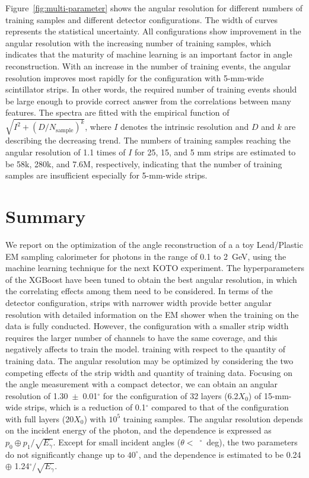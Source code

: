 \documentclass[12pt,times,draftclsnofoot,a4paper]{elsarticle}
\begin{document}
Figure~\ref{fig:multi-parameter} shows the angular resolution for different numbers of training samples and different detector configurations. The width of curves represents the statistical uncertainty. All configurations show improvement in the angular resolution with the increasing number of training samples, which indicates that the maturity of machine learning is an important factor in angle reconstruction. With an increase in the number of training events, the angular resolution improves most rapidly for the configuration with 5-mm-wide scintillator strips. In other words, the required number of training events should be large enough to provide correct answer from the correlations 
between many features. The spectra are fitted with the empirical function of $\sqrt{I^{2} + (D/N_{\mathrm{sample}})^{k}}$, where $I$ denotes the intrinsic resolution and $D$ and $k$ are describing the decreasing trend. The numbers of training samples reaching the angular resolution of 1.1 times of $I$ for 25, 15, and 5 mm strips are estimated to be 58k, 280k, and 7.6M, respectively, indicating that the number of training samples are insufficient especially for 5-mm-wide strips.
 
\section{Summary}
\label{sec:sum}

We report on the optimization of the angle reconstruction of a a toy Lead/Plastic EM sampling calorimeter for photons in the range of 0.1 to 2~GeV, using the machine learning technique for the next KOTO experiment. The hyperparameters of the XGBoost have been tuned to obtain the best angular resolution, in which the correlating effects among them need to be considered. In terms of the detector configuration, strips with narrower width provide better angular resolution with detailed information on the EM shower when the training on the data is fully conducted. However, the configuration with a smaller strip width requires the larger number of channels to have the same coverage, and this negatively affects to train the model. training with respect to the quantity of training data. The angular resolution may be optimized by considering the two competing effects of the strip width and quantity of training data. Focusing on the angle measurement with a compact detector, we can obtain an angular resolution of 1.30~$\pm$~0.01$^{\circ}$ for the configuration of 32 layers (6.2$X_{0}$) of 15-mm-wide strips, which is a reduction of 0.1$^{\circ}$ compared to that of the configuration with full layers (20$X_{0}$) with $10^{5}$ training samples. The angular resolution depends on the incident energy of the photon, and the dependence is expressed as $p_{0} \oplus p_{1}/\sqrt{E_{\gamma}}$. Except for small incident angles ($\theta<$~$^{\circ}$~deg), the two parameters do not significantly change up to $40^{\circ}$, and the dependence is estimated to be 0.24 $\oplus$ 1.24$^{\circ}/\sqrt{E_{\gamma}}$.
\end{document}
